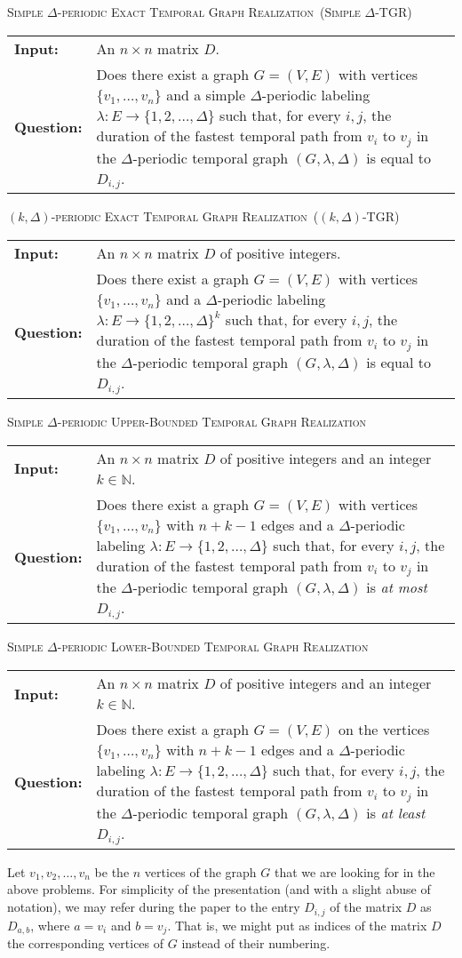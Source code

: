 \documentclass[11pt,a4paper]{article}
\makeatletter
\theoremstyle{remark}
\theoremstyle{definition}
\newcommand{\problemdef}[3]{
	\begin{center}
		\begin{minipage}{0.95\textwidth}
			\noindent
			#1
			\vspace{5pt}\\
			\setlength{\tabcolsep}{3pt}
			\begin{tabularx}{\textwidth}{@{}lX@{}}
				\textbf{Input:}& #2 \\
				\textbf{Question:}& #3
			\end{tabularx}
		\end{minipage}
	\end{center}
}
\newcommand{\deltaExactLong}{\textsc{Simple $\Delta$-periodic Exact Temporal Graph Realization}}
\newcommand{\deltaExact}{\textsc{Simple $\Delta$-TGR}}
\newcommand{\kDeltaExactLong}{\textsc{$(k,\Delta)$-periodic Exact Temporal Graph Realization}}
\newcommand{\kDeltaExact}{\textsc{$(k,\Delta)$-TGR}}
\newcommand{\kDeltaUpperBoundLong}{\textsc{Simple $\Delta$-periodic Upper-Bounded Temporal Graph Realization}}
\newcommand{\kDeltaLowerBoundLong}{\textsc{Simple $\Delta$-periodic Lower-Bounded Temporal Graph Realization}}
\makeatother
\begin{document}
	
	
\problemdef{\deltaExactLong\ (\deltaExact)}
{An $n \times n$ matrix $D$.}
{Does there exist a graph $G=(V,E)$ with vertices $\{v_1,\ldots,v_{n}\}$ 
and a simple $\Delta$-periodic labeling $\lambda: E \rightarrow \{1,2,\ldots,\Delta\}$ such that, 
for every $i,j$, the duration of the fastest temporal path from $v_i$ to $v_j$ in the $\Delta$-periodic temporal graph $(G,\lambda,\Delta)$ is equal to $D_{i,j}$.}

\problemdef{\kDeltaExactLong\ (\kDeltaExact)}
{An $n \times n$ matrix $D$ of positive integers.}
{Does there exist a graph $G=(V,E)$ with vertices $\{v_1,\ldots,v_{n}\}$ 
and a $\Delta$-periodic labeling $\lambda: E \rightarrow \{1,2,\ldots,\Delta\}^k$ such that, 
for every $i,j$, the duration of the fastest temporal path from $v_i$ to $v_j$ in the $\Delta$-periodic temporal graph $(G,\lambda,\Delta)$ is equal to $D_{i,j}$.}

\problemdef{\kDeltaUpperBoundLong}
{An $n \times n$ matrix $D$ of positive integers and an integer $k\in \mathbb{N}$.}
{Does there exist a graph $G=(V,E)$ with vertices $\{v_1,\ldots,v_{n}\}$ with $n+k-1$ edges 
and a $\Delta$-periodic labeling $\lambda: E \rightarrow \{1,2,\ldots,\Delta\}$ such that, 
for every $i,j$, the duration of the fastest temporal path from $v_i$ to $v_j$ in the $\Delta$-periodic temporal graph $(G,\lambda,\Delta)$ is \emph{at most} $D_{i,j}$.}

\problemdef{\kDeltaLowerBoundLong}
{An $n \times n$ matrix $D$ of positive integers and an integer $k\in \mathbb{N}$.}
{Does there exist a graph $G=(V,E)$ on the vertices $\{v_1,\ldots,v_{n}\}$ with $n+k-1$ edges 
and a $\Delta$-periodic labeling $\lambda: E \rightarrow \{1,2,\ldots,\Delta\}$ such that, 
for every $i,j$, the duration of the fastest temporal path from $v_i$ to $v_j$ in the $\Delta$-periodic temporal graph $(G,\lambda,\Delta)$ is \emph{at least} $D_{i,j}$.}


Let $v_1,v_2,\ldots,v_n$ be the $n$ vertices of the graph $G$ that we are looking for in the above problems. 
For simplicity of the presentation (and with a slight abuse of notation), we may refer during the paper to the entry $D_{i,j}$ of the matrix $D$ as 
$D_{a,b}$, where $a=v_i$ and $b=v_j$. That is, we might put as indices of the matrix $D$ the corresponding vertices of $G$ instead of their numbering.
\end{document}

